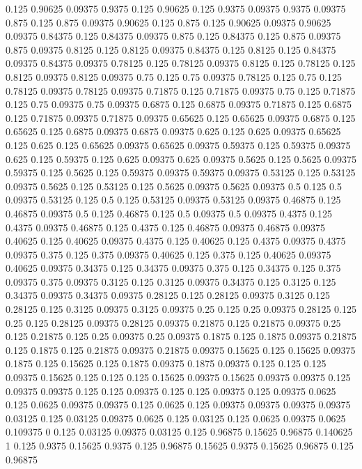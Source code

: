 0.125 0.90625
0.09375 0.9375
0.125 0.90625
0.125 0.9375
0.09375 0.9375
0.09375 0.875
0.125 0.875
0.09375 0.90625
0.125 0.875
0.125 0.90625
0.09375 0.90625
0.09375 0.84375
0.125 0.84375
0.09375 0.875
0.125 0.84375
0.125 0.875
0.09375 0.875
0.09375 0.8125
0.125 0.8125
0.09375 0.84375
0.125 0.8125
0.125 0.84375
0.09375 0.84375
0.09375 0.78125
0.125 0.78125
0.09375 0.8125
0.125 0.78125
0.125 0.8125
0.09375 0.8125
0.09375 0.75
0.125 0.75
0.09375 0.78125
0.125 0.75
0.125 0.78125
0.09375 0.78125
0.09375 0.71875
0.125 0.71875
0.09375 0.75
0.125 0.71875
0.125 0.75
0.09375 0.75
0.09375 0.6875
0.125 0.6875
0.09375 0.71875
0.125 0.6875
0.125 0.71875
0.09375 0.71875
0.09375 0.65625
0.125 0.65625
0.09375 0.6875
0.125 0.65625
0.125 0.6875
0.09375 0.6875
0.09375 0.625
0.125 0.625
0.09375 0.65625
0.125 0.625
0.125 0.65625
0.09375 0.65625
0.09375 0.59375
0.125 0.59375
0.09375 0.625
0.125 0.59375
0.125 0.625
0.09375 0.625
0.09375 0.5625
0.125 0.5625
0.09375 0.59375
0.125 0.5625
0.125 0.59375
0.09375 0.59375
0.09375 0.53125
0.125 0.53125
0.09375 0.5625
0.125 0.53125
0.125 0.5625
0.09375 0.5625
0.09375 0.5
0.125 0.5
0.09375 0.53125
0.125 0.5
0.125 0.53125
0.09375 0.53125
0.09375 0.46875
0.125 0.46875
0.09375 0.5
0.125 0.46875
0.125 0.5
0.09375 0.5
0.09375 0.4375
0.125 0.4375
0.09375 0.46875
0.125 0.4375
0.125 0.46875
0.09375 0.46875
0.09375 0.40625
0.125 0.40625
0.09375 0.4375
0.125 0.40625
0.125 0.4375
0.09375 0.4375
0.09375 0.375
0.125 0.375
0.09375 0.40625
0.125 0.375
0.125 0.40625
0.09375 0.40625
0.09375 0.34375
0.125 0.34375
0.09375 0.375
0.125 0.34375
0.125 0.375
0.09375 0.375
0.09375 0.3125
0.125 0.3125
0.09375 0.34375
0.125 0.3125
0.125 0.34375
0.09375 0.34375
0.09375 0.28125
0.125 0.28125
0.09375 0.3125
0.125 0.28125
0.125 0.3125
0.09375 0.3125
0.09375 0.25
0.125 0.25
0.09375 0.28125
0.125 0.25
0.125 0.28125
0.09375 0.28125
0.09375 0.21875
0.125 0.21875
0.09375 0.25
0.125 0.21875
0.125 0.25
0.09375 0.25
0.09375 0.1875
0.125 0.1875
0.09375 0.21875
0.125 0.1875
0.125 0.21875
0.09375 0.21875
0.09375 0.15625
0.125 0.15625
0.09375 0.1875
0.125 0.15625
0.125 0.1875
0.09375 0.1875
0.09375 0.125
0.125 0.125
0.09375 0.15625
0.125 0.125
0.125 0.15625
0.09375 0.15625
0.09375 0.09375
0.125 0.09375
0.09375 0.125
0.125 0.09375
0.125 0.125
0.09375 0.125
0.09375 0.0625
0.125 0.0625
0.09375 0.09375
0.125 0.0625
0.125 0.09375
0.09375 0.09375
0.09375 0.03125
0.125 0.03125
0.09375 0.0625
0.125 0.03125
0.125 0.0625
0.09375 0.0625
0.109375 0
0.125 0.03125
0.09375 0.03125
0.125 0.96875
0.15625 0.96875
0.140625 1
0.125 0.9375
0.15625 0.9375
0.125 0.96875
0.15625 0.9375
0.15625 0.96875
0.125 0.96875
